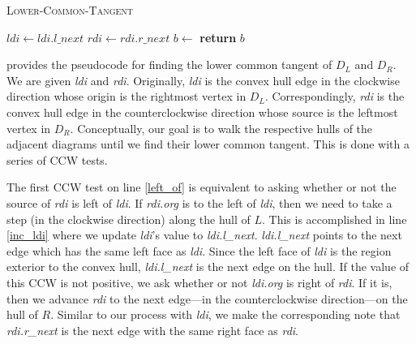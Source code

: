 \documentclass[12pt,twoside]{reedthesis}
\begin{document}
      \begin{algorithm}[!htb]
        \caption{\textsc{Lower-Common-Tangent}}\label{del_lct}
         \begin{algorithmic}[1]
        \Loop
           \label{left_of}
            \State $ldi\gets \textit{ldi.l\_next}$ \label{inc_ldi}
           \label{right_of}
            \State $rdi\gets \textit{rdi.r\_next}$
          \Else
            \State $b\gets$
            \State \textbf{return} $b$ \label{lct_fin}
          \EndIf
        \EndLoop
        \EndProcedure
        \end{algorithmic} 
        \end{algorithm}

       provides the pseudocode for finding the lower common tangent of $D_{L}$ and $D_{R}$. We are given \textit{ldi} and \textit{rdi}. Originally, \textit{ldi} is the convex hull edge in the clockwise direction whose origin is the rightmost vertex in $D_{L}$. Correspondingly, \textit{rdi} is the convex hull edge in the counterclockwise direction whose source is the leftmost vertex in $D_{R}$. Conceptually, our goal is to walk  the respective hulls of the adjacent diagrams until we find their lower common tangent. This is done with a series of \textsc{CCW} tests.\par 

      The first \textsc{CCW} test on line \ref{left_of} is equivalent to asking whether or not the source of \textit{rdi} is left of \textit{ldi}. If \textit{rdi.org} is to the left of \textit{ldi}, then we need to take a step (in the clockwise direction) along the hull of $L$. This is accomplished in line \ref{inc_ldi} where we update \textit{ldi}'s value to \textit{ldi.l\_next}. \textit{ldi.l\_next} points to the next edge which has the same left face as \textit{ldi}. Since the left face of \textit{ldi} is the region exterior to the convex hull, \textit{ldi.l\_next} is the next edge on the hull. If the value of this \textsc{CCW} is not positive, we ask whether or not \textit{ldi.org} is right of \textit{rdi}. If it is, then we advance \textit{rdi} to the next edge---in the counterclockwise direction---on the hull of $R$. Similar to our process with \textit{ldi}, we make the corresponding note that \textit{rdi.r\_next} is the next edge with the same right face as \textit{rdi}.\par
\end{document}
